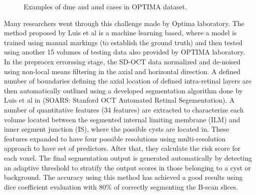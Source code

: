 \begin{figure}[t]
\begin{center}
   
\end{center}
    \caption{Examples of \acs{dme} and \acs{amd} cases in OPTIMA dataset.}
\end{figure}

Many researchers went through this challenge made by Optima laboratory.
The method proposed by Luis et al \cite{LuisdeSisternes2015Optima} is a machine learning based, where a model is trained using manual markings (to establish the ground truth) and then tested using another 15 volumes of testing data also provided by OPTIMA laboratory.
In the preprocex errorssing stage, the SD-OCT data normalized and de-noised using non-local means filtering in the axial and horizontal direction.
A defined number of boundaries defining the axial location of defined intra-retinal layers are then automatically outlined using a developed segmentation algorithm done by Luis et al in \cite{de2015localization} (SOARS: Stanford OCT Automated Retinal Segementation).
A number of quantitative features (34 features) are extracted to characterize each volume located between the segmented internal limiting membrane (ILM) and inner segment junction (IS), where the possible cysts are located in.
These features expanded to have four possible resolutions using multi-resolution approach to have set of predictors. 
After that, they calculate the risk score for each voxel.
The final segmentation output is generated automatically by detecting an adaptive threshold to
stratify the output scores in those belonging to a cyst or background.
The accuracy using this method has achieved a good results using dice coefficient evaluation with 80\% of correctly segmenting the B-scan slices.

